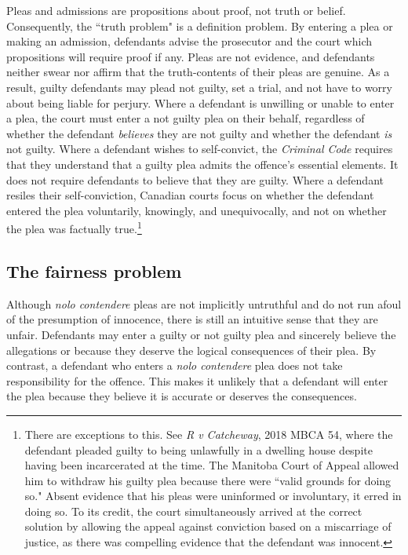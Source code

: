 Pleas and admissions are propositions about proof, not truth or belief. Consequently, the ``truth problem" is a definition problem. By entering a plea or making an admission, defendants advise the prosecutor and the court which propositions will require proof if any. Pleas are not evidence, and defendants neither swear nor affirm that the truth-contents of their pleas are genuine. As a result, guilty defendants may plead not guilty, set a trial, and not have to worry about being liable for perjury. Where a defendant is unwilling or unable to enter a plea, the court must enter a not guilty plea on their behalf, regardless of whether the defendant \textit{believes} they are not guilty and whether the defendant \textit{is} not guilty. Where a defendant wishes to self-convict, the \textit{Criminal Code} requires that they understand that a guilty plea admits the offence's essential elements. It does not require defendants to believe that they are guilty. Where a defendant resiles their self-conviction, Canadian courts focus on whether the defendant entered the plea voluntarily, knowingly, and unequivocally, and not on whether the plea was factually true.\footnote{There are exceptions to this. See \textit{R v Catcheway}, 2018 MBCA 54, where the defendant pleaded guilty to being unlawfully in a dwelling house despite having been incarcerated at the time. The Manitoba Court of Appeal allowed him to withdraw his guilty plea because there were ``valid grounds for doing so." Absent evidence that his pleas were uninformed or involuntary, it erred in doing so. To its credit, the court simultaneously arrived at the correct solution by allowing the appeal against conviction based on a miscarriage of justice, as there was compelling evidence that the defendant was innocent.}

\subsection{The fairness problem}

Although \textit{nolo contendere} pleas are not implicitly untruthful and do not run afoul of the presumption of innocence, there is still an intuitive sense that they are unfair. Defendants may enter a guilty or not guilty plea and sincerely believe the allegations or because they deserve the logical consequences of their plea. By contrast, a defendant who enters a \textit{nolo contendere} plea does not take responsibility for the offence. This makes it unlikely that a defendant will enter the plea because they believe it is accurate or deserves the consequences.

